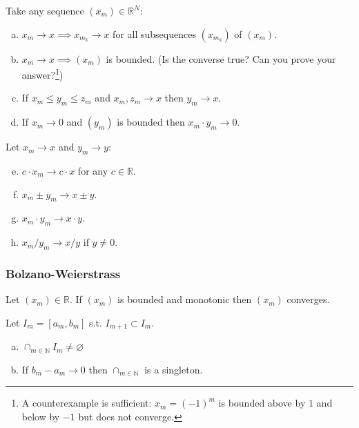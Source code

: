 \documentclass{article}
\begin{document}
\begin{theorem}
  Take any sequence $(x_m) \in \mathbb{R}^N$:
  \begin{enumerate}[a)]
    \item $x_m \to x \implies x_{m_k} \to x$ for all subsequences $(x_{m_k})$ of $(x_m)$.

    \item $x_m \to x \implies (x_m)$ is bounded. (Is the converse true? Can you prove your answer?\footnote{A counterexample is sufficient: $x_m = (-1)^m$ is bounded above by $1$ and below by $-1$ but does not converge.})

    \item If $x_m \le y_m \le z_m$ and $x_m, z_m \to x$ then $y_m \to x$.

    \item If $x_m \to 0$ and $(y_m)$ is bounded then $x_m \cdot y_m \to 0$.
  \end{enumerate}

  Let $x_m \to x$ and $y_m \to y$:
  \begin{enumerate}[a)]\setcounter{enumi}{4}
    \item $c \cdot x_m \to c \cdot x$ for any $c \in \mathbb{R}$.

    \item $x_m \pm y_m \to x \pm y$.

    \item $x_m \cdot y_m \to x \cdot y$.

    \item $x_m / y_m \to x / y$ if $y \ne 0$.
  \end{enumerate}
\end{theorem}


\subsubsection{Bolzano-Weierstrass}
\label{ssub:bolzano_weierstrass}

\begin{theorem}\label{thm:lecture2_bounded_mono_converge}
  Let $(x_m) \in \mathbb{R}$. If $(x_m)$ is bounded and monotonic then $(x_m)$ converges.
\end{theorem}

\begin{theorem}\label{thm:lecture2_nested_interval}
  Let $I_m = [a_m,  b_m]$ s.t. $I_{m + 1} \subset I_m$.
  \begin{enumerate}[a)]
    \item $\cap_{m \in \mathbb{N}} I_m \ne \varnothing$
    \item If $b_m - a_m \to 0$ then $\cap_{m \in \mathbb{N}}$ is  a singleton.
  \end{enumerate}
\end{theorem}
\end{document}
